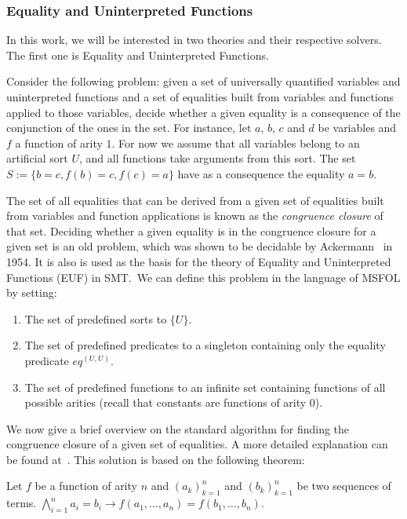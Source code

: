 \subsubsection{Equality and Uninterpreted Functions}

In this work, we will be interested in two theories and their respective solvers. The first one is Equality and Uninterpreted Functions.

Consider the following problem: given a set of universally quantified variables and uninterpreted functions and a set of equalities built from variables and functions applied to those variables, decide whether a given equality is a consequence of the conjunction of the ones in the set. For instance, let $a$, $b$, $c$ and $d$ be variables and $f$ a function of arity $1$. For now we assume that all variables belong to an artificial sort $U$, and all functions take arguments from this sort. The set $S := \{b = c, f(b) = c, f(c) = a\}$ have as a consequence the equality $a = b$.

The set of all equalities that can be derived from a given set of equalities built from variables and function applications is known as the \textit{congruence closure} of that set. Deciding whether a given equality is in the congruence closure for a given set is an old problem, which was shown to be decidable by Ackermann~\cite{ack_cong} in 1954. It is also is used as the basis for the theory of Equality and Uninterpreted Functions (EUF) in SMT.~We can define this problem in the language of MSFOL by setting:
\begin{enumerate}
  \item The set of predefined sorts to $\{U\}$.
  \item The set of predefined predicates to a singleton containing only the equality predicate $eq^{(U, U)}$.
  \item The set of predefined functions to an infinite set containing functions of all possible arities (recall that constants are functions of arity $0$).
\end{enumerate}

We now give a brief overview on the standard algorithm for finding the congruence closure of a given set of equalities. A more detailed explanation can be found at~\cite{orig_cong_clos}. This solution is based on the following theorem:

\begin{theorem}[Congruence]\label{cong_theorem}
Let $f$ be a function of arity $n$ and ${(a_{k})}_{k = 1}^{n}$ and ${(b_{k})}_{k = 1}^{n}$ be two sequences of terms. $\bigwedge_{i = 1}^{n} a_{i} = b_{i} \rightarrow f(a_{1}, \ldots, a_{n}) = f(b_{1}, \ldots, b_{n})$.
\end{theorem}

